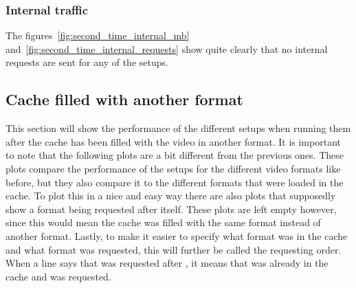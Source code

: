 \documentclass[twoside,openright]{uva-bachelor-thesis}
\begin{document}
\subsubsection{Internal traffic}
The figures~\ref{fig:second_time_internal_mb}
and~\ref{fig:second_time_internal_requests} show quite clearly that no internal
requests are sent for any of the setups.




\FloatBarrier
\subsection{Cache filled with another format}
This section will show the performance of the different setups when running them
after the cache has been filled with the video in another format. It is important to
note that the following plots are a bit different from the previous ones. These
plots compare the performance of the setups for the different video
formats like before, but they also compare it to the different formats that were
loaded in the cache. To plot this in a nice and easy way there are also
plots that supposedly show a format being requested after itself. These plots
are left empty however, since this would mean the cache was filled with the same
format instead of another format.
Lastly, to make it easier to specify what format was in the cache and what
format was requested, this will further be called the requesting order. When a
line says that \dash was requested after \iss, it means that \iss was already in
the cache and \dash was requested.
\end{document}
